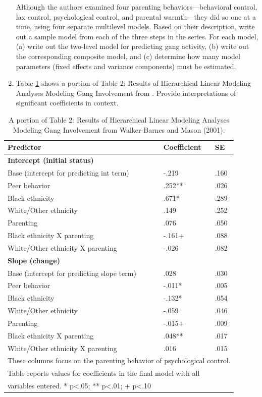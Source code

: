 \documentclass[
]{krantz}
\begin{document}
\begin{enumerate}
  Although the authors examined four parenting behaviors---behavioral control, lax control, psychological control, and parental warmth---they did so one at a time, using four separate multilevel models. Based on their description, write out a sample model from each of the three steps in the series. For each model, (a) write out the two-level model for predicting gang activity, (b) write out the corresponding composite model, and (c) determine how many model parameters (fixed effects and variance components) must be estimated.
\item
  Table \ref{tab:table4chp9} shows a portion of Table 2: Results of Hierarchical Linear Modeling Analyses Modeling Gang Involvement from \citet{Walker-Barnes2001}. Provide interpretations of significant coefficients in context.
\end{enumerate}

\begin{table}
\centering
\caption{\label{tab:table4chp9}A portion of Table 2: Results of Hierarchical Linear Modeling Analyses Modeling Gang Involvement from Walker-Barnes and Mason (2001).}
\centering
\begin{tabular}[t]{lll}
\toprule
Predictor & Coefficient & SE\\
\midrule
\textbf{Intercept (initial status)} & \textbf{} & \textbf{}\\
Base (intercept for predicting int term) & -.219 & .160\\
Peer behavior & .252** & .026\\
Black ethnicity & .671* & .289\\
White/Other ethnicity & .149 & .252\\
\addlinespace
Parenting & .076 & .050\\
Black ethnicity X parenting & -.161+ & .088\\
White/Other ethnicity X parenting & -.026 & .082\\
\textbf{Slope (change)} & \textbf{} & \textbf{}\\
Base (intercept for predicting slope term) & .028 & .030\\
\addlinespace
Peer behavior & -.011* & .005\\
Black ethnicity & -.132* & .054\\
White/Other ethnicity & -.059 & .046\\
Parenting & -.015+ & .009\\
Black ethnicity X parenting & .048** & .017\\
\addlinespace
White/Other ethnicity X parenting & .016 & .015\\
\bottomrule
\multicolumn{3}{l}{\rule{0pt}{1em}These columns focus on the parenting behavior of psychological control.}\\
\multicolumn{3}{l}{\rule{0pt}{1em}Table reports values for coefficients in the final model with all}\\
\multicolumn{3}{l}{\rule{0pt}{1em}variables entered.  * p<.05; ** p<.01; + p<.10}\\
\end{tabular}
\end{table}
\end{document}
